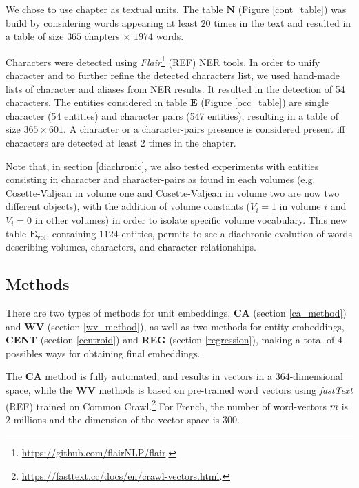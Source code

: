 \documentclass[
twocolumn,
]{ceurart}
\begin{document}
We chose to use chapter as textual units. The table $\mathbf{N}$ (Figure \ref{cont_table}) was build by considering words appearing at least $20$ times in the text and resulted in a table of size $365$ chapters $\times$ $1974$ words.

Characters were detected using \emph{Flair}\footnote{\url{https://github.com/flairNLP/flair}.} (REF) NER tools. In order to unify character and to further refine the detected characters list, we used hand-made lists of character and aliases from NER results. It resulted in the detection of 54 characters. The entities considered in table $\mathbf{E}$ (Figure \ref{occ_table}) are single character (54 entities) and character pairs (547 entities), resulting in a table of size $365 \times 601$. A character or a character-pairs presence is considered present iff characters are detected at least 2 times in the chapter. 

Note that, in section \ref{diachronic}, we also tested experiments with entities consisting in character and character-pairs as found in each volumes (e.g. Cosette-Valjean in volume one and Cosette-Valjean in volume two are now two different objects), with the addition of volume constants ($V_i=1$ in volume $i$ and $V_i=0$ in other volumes) in order to isolate specific volume vocabulary. This new table $\mathbf{E}_\text{vol}$, containing $1124$ entities, permits to see a diachronic evolution of words describing volumes, characters, and character relationships. 

\subsection{Methods}

There are two types of methods for unit embeddings, \textbf{CA} (section \ref{ca_method}) and \textbf{WV} (section \ref{wv_method}), as well as two methods for entity embeddings, \textbf{CENT} (section \ref{centroid}) and \textbf{REG} (section \ref{regression}), making a total of 4 possibles ways for obtaining final embeddings. 

The \textbf{CA} method is fully automated, and results in vectors in a $364$-dimensional space, while the $\textbf{WV}$ methods is based on pre-trained word vectors using \emph{fastText} (REF) trained on Common Crawl.\footnote{\url{ https://fasttext.cc/docs/en/crawl-vectors.html}.} For French, the number of word-vectors $m$ is 2 millions and the dimension of the vector space is $300$. 
\end{document}
